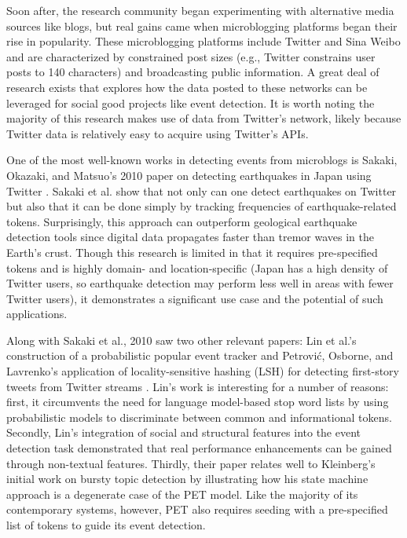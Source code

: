 \documentclass{sig-alternate}
\begin{document}

Soon after, the research community began experimenting with alternative media sources like blogs, but real gains came when microblogging platforms began their rise in popularity.
These microblogging platforms include Twitter and Sina Weibo and are characterized by constrained post sizes (e.g., Twitter constrains user posts to 140 characters) and broadcasting public information.
A great deal of research exists that explores how the data posted to these networks can be leveraged for social good projects like event detection.
It is worth noting the majority of this research makes use of data from Twitter's network, likely because Twitter data is relatively easy to acquire using Twitter's APIs.

One of the most well-known works in detecting events from microblogs is Sakaki, Okazaki, and Matsuo's 2010 paper on detecting earthquakes in Japan using Twitter \cite{Sakaki:2010:EST:1772690.1772777}.
Sakaki et al. show that not only can one detect earthquakes on Twitter but also that it can be done simply by tracking frequencies of earthquake-related tokens.
Surprisingly, this approach can outperform geological earthquake detection tools since digital data propagates faster than tremor waves in the Earth's crust.
Though this research is limited in that it requires pre-specified tokens and is highly domain- and location-specific (Japan has a high density of Twitter users, so earthquake detection may perform less well in areas with fewer Twitter users), it demonstrates a significant use case and the potential of such applications.

Along with Sakaki et al., 2010 saw two other relevant papers: Lin et al.'s construction of a probabilistic popular event tracker \cite{Lin:2010:PSM:1835804.1835922} and Petrovi\'{c}, Osborne, and Lavrenko's application of locality-sensitive hashing (LSH) for detecting first-story tweets from Twitter streams \cite{Petrovic:2010:SFS:1857999.1858020}.
Lin's work is interesting for a number of reasons: first, it circumvents the need for language model-based stop word lists by using probabilistic models to discriminate between common and informational tokens.
Secondly, Lin's integration of social and structural features into the event detection task demonstrated that real performance enhancements can be gained through non-textual features.
Thirdly, their paper relates well to Kleinberg's initial work on bursty topic detection by illustrating how his state machine approach is a degenerate case of the PET model.
Like the majority of its contemporary systems, however, PET also requires seeding with a pre-specified list of tokens to guide its event detection.
\end{document}
